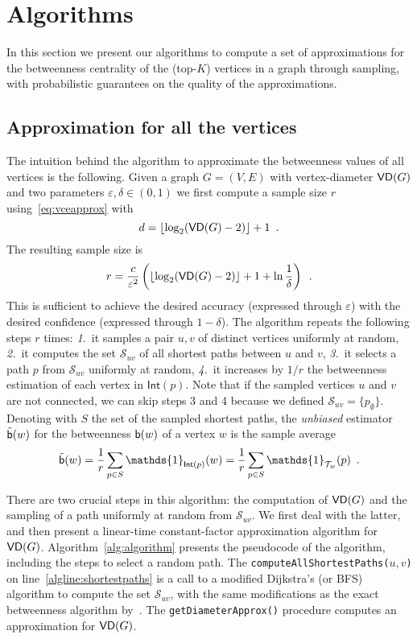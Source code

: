 \section{Algorithms}\label{sec:algo}
In this section we present our algorithms to compute a set of approximations for the
betweenness centrality of the (top-$K$) vertices in a graph through sampling,
with probabilistic guarantees on the quality of the approximations.

\subsection{Approximation for all the vertices}\label{sec:allvertapprox}
The intuition behind the algorithm to approximate the betweenness values of all
vertices is the following. Given a graph $G=(V,E)$
with vertex-diameter $\mathsf{VD}(G)$ and two parameters $\varepsilon,\delta\in(0,1)$
we first compute a sample size $r$ using~\eqref{eq:vceapprox} with
\[d=\lfloor\log_2(\mathsf{VD}(G)-2)\rfloor+1\enspace.\]
The resulting sample size is
\begin{equation}\label{eq:samplesize}
r=\frac{c}{\varepsilon^2}\left(\lfloor\log_2(\VD(G)-2)\rfloor+1+\ln\frac{1}{\delta}\right)\enspace.
\end{equation}
This is sufficient to achieve the desired accuracy
(expressed through $\varepsilon$) with the desired confidence (expressed through
$1-\delta$). The algorithm repeats the following steps $r$ times:
\emph{1.}~it samples a pair $u,v$ of distinct vertices uniformly at random,
\emph{2.}~it
computes the set $\mathcal{S}_{uv}$ of all shortest paths between $u$ and $v$,
\emph{3.}~it selects a path $p$ from $\mathcal{S}_{uv}$ uniformly at random,
\emph{4.}~it increases by $1/r$ the betweenness estimation of each vertex in
$\mathsf{Int}(p)$. Note that if the sampled vertices $u$ and $v$ are not
connected, we can skip steps 3 and 4 because we defined
$\mathcal{S}_{uv}=\{p_\emptyset\}$. Denoting with $S$ the set of the sampled
shortest paths, the \emph{unbiased} estimator $\tilde{\mathsf{b}}(w)$ for the betweenness
$\mathsf{b}(w)$ of a vertex $w$ is the sample average 
\[
\tilde\betw(w) = \frac{1}{r}\sum_{p\in S}
\mathds{1}_{\mathsf{Int}(p)}(w) = \frac{1}{r}\sum_{p\in S}
\mathds{1}_{\mathcal{T}_w}(p)\enspace.
\]

There are two crucial steps in this algorithm: the computation of $\mathsf{VD}(G)$ and
the sampling of a path uniformly at random from $\mathcal{S}_{uv}$. We first
deal with the latter, and then present a linear-time constant-factor approximation algorithm for $\mathsf{VD}(G)$.
Algorithm~\ref{alg:algorithm} presents the pseudocode of the algorithm,
including the steps to select a random path.  The
\texttt{computeAllShortestPaths(}$u,v$\texttt{)}  on
line~\ref{algline:shortestpaths} is a call to a modified Dijkstra's (or BFS)
algorithm to compute the set $\mathcal{S}_{uv}$, with the same modifications
as the exact betweenness algorithm by~\citet{Brandes01}. The \texttt{getDiameterApprox()} procedure computes an approximation for $\mathsf{VD}(G)$. %



